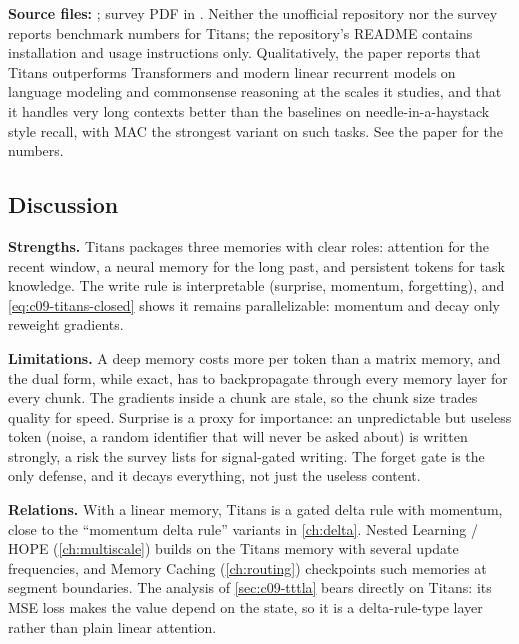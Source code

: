 \begin{results}
\textbf{Source files:} ; survey PDF in
. Neither the unofficial repository nor the survey reports benchmark numbers
for Titans; the repository's README contains installation and usage instructions only.
Qualitatively, the paper reports that Titans outperforms Transformers and modern linear
recurrent models on language modeling and commonsense reasoning at the scales it studies, and
that it handles very long contexts better than the baselines on needle-in-a-haystack style
recall, with MAC the strongest variant on such tasks. See the paper for the numbers.
\end{results}

\subsection{Discussion}

\textbf{Strengths.} Titans packages three memories with clear roles: attention for the recent
window, a neural memory for the long past, and persistent tokens for task knowledge. The write
rule is interpretable (surprise, momentum, forgetting), and \eqref{eq:c09-titans-closed} shows
it remains parallelizable: momentum and decay only reweight gradients.

\textbf{Limitations.} A deep memory costs more per token than a matrix memory, and the dual
form, while exact, has to backpropagate through every memory layer for every chunk. The
gradients inside a chunk are stale, so the chunk size trades quality for speed. Surprise is a
proxy for importance: an unpredictable but useless token (noise, a random identifier that will
never be asked about) is written strongly, a risk the survey lists for signal-gated writing.
The forget gate is the only defense, and it decays everything, not just the useless content.

\textbf{Relations.} With a linear memory, Titans is a gated delta rule with momentum, close to
the ``momentum delta rule'' variants in \cref{ch:delta}. Nested Learning / HOPE
(\cref{ch:multiscale}) builds on the Titans memory with several update frequencies, and Memory
Caching (\cref{ch:routing}) checkpoints such memories at segment boundaries. The analysis of
\cref{sec:c09-tttla} bears directly on Titans: its MSE loss makes the value depend on the
state, so it is a delta-rule-type layer rather than plain linear attention.

